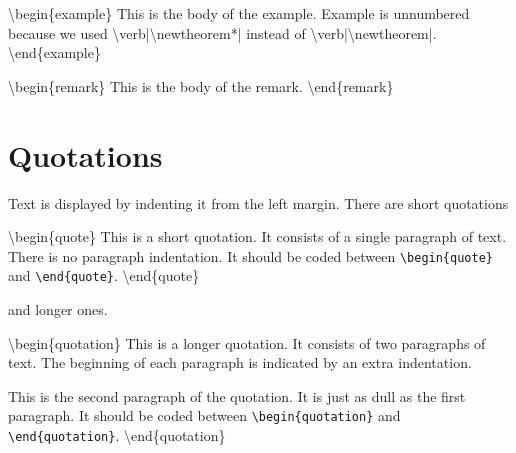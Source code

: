 \documentclass[qe,nameyear,draft]{econsocart}
\theoremstyle{plain}
\theoremstyle{remark}
\begin{document}
{\textbackslash}begin\{example\}
This is the body of the example. Example is unnumbered because we used {\textbackslash}verb|{\textbackslash}newtheorem*|
instead of {\textbackslash}verb|{\textbackslash}newtheorem|.
{\textbackslash}end\{example\}

{\textbackslash}begin\{remark\}
This is the body of the remark.
{\textbackslash}end\{remark\}

\section{Quotations}

Text is displayed by indenting it from the left margin. There are short quotations

{\textbackslash}begin\{quote\}
This is a short quotation. It consists of a
single paragraph of text. There is no paragraph
indentation. It should be coded between \texttt{{\textbackslash}begin\{quote\}} and \texttt{{\textbackslash}end\{quote\}}.
{\textbackslash}end\{quote\}

and longer ones.

{\textbackslash}begin\{quotation\}
This is a longer quotation. It consists of two paragraphs
of text. The beginning of each paragraph is indicated
by an extra indentation.

This is the second paragraph of the quotation. It is just
as dull as the first paragraph. It should be coded between \texttt{{\textbackslash}begin\{quotation\}} and \texttt{{\textbackslash}end\{quotation\}}.
{\textbackslash}end\{quotation\}

%
\end{document}
